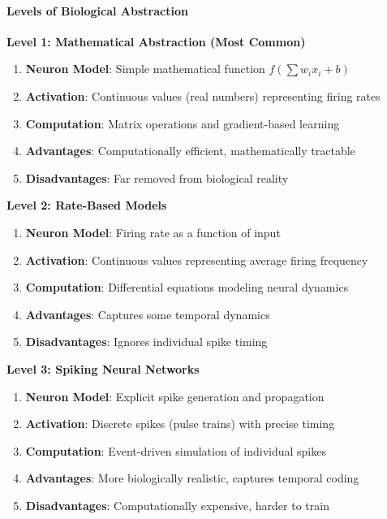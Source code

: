 \paragraph{Levels of Biological Abstraction}
\label{para:levels-biological-abstraction}

\textbf{Level 1: Mathematical Abstraction (Most Common)}

\begin{enumerate}
\item \textbf{Neuron Model}: Simple mathematical function $f\left(\sum w_i x_i + b\right)$
\item \textbf{Activation}: Continuous values (real numbers) representing firing rates
\item \textbf{Computation}: Matrix operations and gradient-based learning
\item \textbf{Advantages}: Computationally efficient, mathematically tractable
\item \textbf{Disadvantages}: Far removed from biological reality
\end{enumerate}

\textbf{Level 2: Rate-Based Models}

\begin{enumerate}
\item \textbf{Neuron Model}: Firing rate as a function of input
\item \textbf{Activation}: Continuous values representing average firing frequency
\item \textbf{Computation}: Differential equations modeling neural dynamics
\item \textbf{Advantages}: Captures some temporal dynamics
\item \textbf{Disadvantages}: Ignores individual spike timing
\end{enumerate}

\textbf{Level 3: Spiking Neural Networks}

\begin{enumerate}
\item \textbf{Neuron Model}: Explicit spike generation and propagation
\item \textbf{Activation}: Discrete spikes (pulse trains) with precise timing
\item \textbf{Computation}: Event-driven simulation of individual spikes
\item \textbf{Advantages}: More biologically realistic, captures temporal coding
\item \textbf{Disadvantages}: Computationally expensive, harder to train
\end{enumerate}

